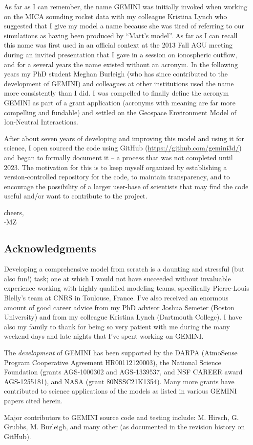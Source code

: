 \documentclass[11pt,letterpaper]{article}
\begin{document}
As far as I can remember, the name GEMINI was initially invoked when working on the MICA sounding rocket data with my colleague Kristina Lynch who suggested that I give my model a name because she was tired of referring to our simulations as having been produced by ``Matt's model''.  As far as I can recall this name was first used in an official context at the 2013 Fall AGU meeting during an invited presentation that I gave in a session on ionospheric outflow, and for a several years the name existed without an acronym.  In the following years my PhD student Meghan Burleigh (who has since contributed to the development of GEMINI) and colleagues at other institutions used the name more consistently than I did.  I was compelled to finally define the acronym GEMINI as part of a grant application (acronyms with meaning are far more compelling and fundable) and settled on the Geospace Environment Model of Ion-Neutral Interactions.  

After about seven years of developing and improving this model and using it for science, I open sourced the code using GitHub (\url{https://github.com/gemini3d/}) and began to formally document it -- a process that was not completed until 2023.  The motivation for this is to keep myself organized by establishing a version-controlled repository for the code, to maintain transparency, and to encourage the possibility of a larger user-base of scientists that may find the code useful and/or want to contribute to the project.  

cheers,\\
-MZ


\subsection{Acknowledgments}

Developing a comprehensive model from scratch is a daunting and stressful (but also fun!) task; one at which I would not have succeeded without invaluable experience working with highly qualified modeling teams, specifically Pierre-Louis Blelly's team at CNRS in Toulouse, France.  I've also received an enormous amount of good career advice from my PhD advisor Joshua Semeter (Boston University) and from my colleague Kristina Lynch (Dartmouth College).  I have also my family to thank for being so very patient with me during the many weekend days and late nights that I've spent working on GEMINI.  

The \emph{development} of GEMINI has been supported by the DARPA (AtmoSense Program Cooperative Agreement HR00112120003), the National Science Foundation (grants AGS-1000302 and AGS-1339537, and NSF CAREER award AGS-1255181), and NASA (grant 80NSSC21K1354).  Many more grants have contributed to science applications of the models as listed in various GEMINI papers cited herein.  

Major contributors to GEMINI source code and testing include:  M. Hirsch, G. Grubbs, M. Burleigh, and many other (as documented in the revision history on GitHub).


\pagebreak
\setcounter{page}{1}


\end{document}
